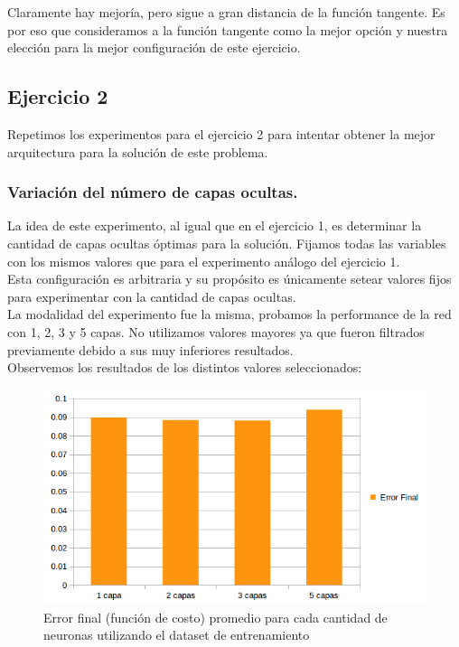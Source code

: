 Claramente hay mejoría, pero sigue a gran distancia de la función tangente. Es por eso que consideramos a la función tangente como la mejor opción y 
nuestra elección para la mejor configuración de este ejercicio.

\newpage
\subsection{Ejercicio 2}

Repetimos los experimentos para el ejercicio 2 para intentar obtener la mejor arquitectura para la solución de este problema.

\subsubsection{Variación del número de capas ocultas.}
La idea de este experimento, al igual que en el ejercicio 1, es determinar la cantidad de capas ocultas óptimas para la solución. Fijamos todas las variables con los mismos valores que para el experimento análogo del ejercicio 1.\\
Esta configuración es arbitraria y su propósito es únicamente setear valores fijos para experimentar con la cantidad de capas ocultas.\\

La modalidad del experimento fue la misma, probamos la performance de la red con 1, 2, 3 y 5 capas. No utilizamos valores mayores ya que fueron filtrados previamente debido a sus muy inferiores resultados.\\

Observemos los resultados de los distintos valores seleccionados:\\

\begin{figure}[h]
  \begin{center}
  \includegraphics[scale=0.75]{graficos/ej2_cant_capas_error_final.png}
  \caption{Error final (función de costo) promedio para cada cantidad de neuronas utilizando el dataset de entrenamiento}
  \end{center}
\end{figure}

